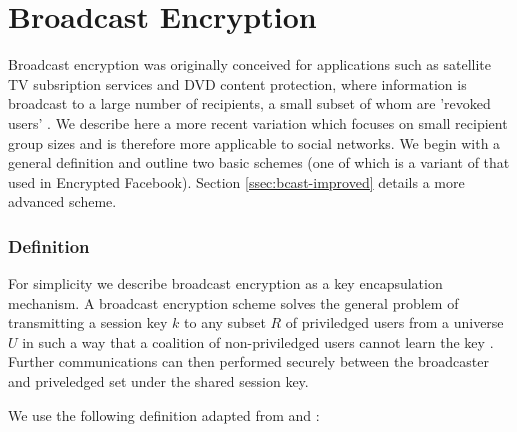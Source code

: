 \chapter{Broadcast Encryption}


Broadcast encryption was originally conceived for applications such as satellite TV subsription services and DVD content protection, where information is broadcast to a large number of recipients, a small subset of whom are 'revoked users' \cite{fiat-naylors}. We describe here a more recent variation which focuses on small recipient group sizes and is therefore more applicable to social networks. We begin with a general definition and outline two basic schemes (one of which is a variant of that used in Encrypted Facebook). Section \ref{ssec:bcast-improved} details a more advanced scheme.


\subsection{Definition}

For simplicity we describe broadcast encryption as a key encapsulation mechanism. A broadcast encryption scheme solves the general problem of transmitting a session key $k$ to any subset $R$ of priviledged users from a universe $U$ in such a way that a coalition of non-priviledged users cannot learn the key \cite{fiat-naor}. Further communications can then performed securely between the broadcaster and priveledged set under the shared session key.

We use the following definition adapted from \cite{fiat-naor} and \cite{boneh}:

